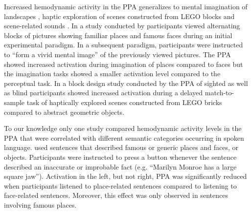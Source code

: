 \documentclass[english]{article}
\begin{document}
Increased hemodynamic activity in the PPA generalizes to mental imagination of
landscapes \citep{ocraven2000mental}, haptic exploration of scenes
constructed from LEGO blocks \citep{wolbers2011modality} and scene-related
sounds \citep{van2017development}.
In a study conducted by \cite{ocraven2000mental} participants viewed alternating
blocks of pictures showing familiar places and famous faces during an initial
experimental paradigm.
In a subsequent paradigm, participants were instructed to ``form a vivid mental
image'' of the previously viewed pictures.
The PPA showed increased activation during imagination of places compared to
faces but the imagination tasks showed a smaller activation level compared to
the perceptual task.
In a block design study conducted by \cite{wolbers2011modality} the PPA of
sighted as well as blind participants showed increased activation during a
delayed match-to-sample task of haptically explored scenes constructed from LEGO
bricks compared to abstract geometric objects.

To our knowledge only one study \citep{aziz2008modulation} compared hemodynamic
activity levels in the PPA that were correlated with different semantic
categories occurring in spoken language.
\cite{aziz2008modulation} used sentences that described famous or generic places
and faces, or objects.
Participants were instructed to press a button whenever the sentence described
an inaccurate or improbable fact (e.g. ``Marilyn Monroe has a large square
jaw'').
Activation in the left, but not right, PPA was significantly reduced when
participants listened to place-related sentences compared to listening to
face-related sentences. Moreover, this effect was only observed in sentences
involving famous places.
\end{document}
